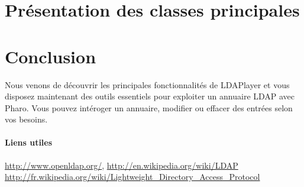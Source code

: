 \documentclass[a4paper,10pt,twoside]{book}
\begin{document}
\section{Pr\'esentation des classes principales}


\section{Conclusion}
Nous venons de d\'ecouvrir les principales fonctionnalit\'es de LDAPlayer et vous disposez maintenant des outils essentiels pour exploiter un annuaire LDAP avec Pharo. Vous pouvez int\'eroger un annuaire, modifier ou effacer des entr\'ees selon vos besoins.

\paragraph{Liens utiles}
\url{http://www.openldap.org/},
\url{http://en.wikipedia.org/wiki/LDAP}
\url{http://fr.wikipedia.org/wiki/Lightweight_Directory_Access_Protocol}


\ifx\wholebook\relax\else
   
   
\end{document}
